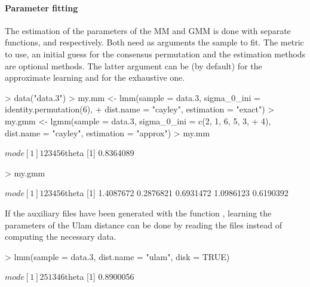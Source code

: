 \documentclass[article,nojss]{jss}
\begin{document}
\paragraph{Parameter fitting}
The estimation of the parameters of the MM and GMM is done with separate functions,  and  respectively. Both need as arguments the sample to fit. The metric to use, an initial guess for the consensus permutation and the estimation methods are optional methods. The latter argument can be  (by default) for the approximate learning and  for the exhaustive one. 
\begin{Schunk}
\begin{Sinput}
> data("data.3")
> my.mm <- lmm(sample = data.3, sigma_0_ini = identity.permutation(6), 
+     dist.name = "cayley", estimation = "exact")
> my.gmm <- lgmm(sample = data.3, sigma_0_ini = c(2, 1, 6, 5, 3, 
+     4), dist.name = "cayley", estimation = "approx")
> my.mm
\end{Sinput}
\begin{Soutput}
$mode
[1] 1 2 3 4 5 6

$theta
[1] 0.8364089
\end{Soutput}
\begin{Sinput}
> my.gmm
\end{Sinput}
\begin{Soutput}
$mode
[1] 1 2 3 4 5 6

$theta
[1] 1.4087672 0.2876821 0.6931472 1.0986123 0.6190392
\end{Soutput}
\end{Schunk}

If the auxiliary files have been generated with the function , learning the parameters of the Ulam distance can be done by reading the files instead of computing the necessary data. 
\begin{Schunk}
\begin{Sinput}
> lmm(sample = data.3, dist.name = "ulam", disk = TRUE)
\end{Sinput}
\begin{Soutput}
$mode
[1] 2 5 1 3 4 6

$theta
[1] 0.8900056
\end{Soutput}
\end{Schunk}
\end{document}
